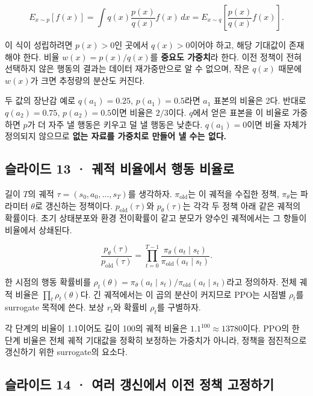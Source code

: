 \documentclass[11pt,a4paper]{article}
\begin{document}
\[
E_{x\sim p}[f(x)]
=\int q(x)\frac{p(x)}{q(x)}f(x)\,dx
=E_{x\sim q}\!\left[\frac{p(x)}{q(x)}f(x)\right].
\]

이 식이 성립하려면 $p(x)>0$인 곳에서 $q(x)>0$이어야 하고, 해당 기대값이 존재해야 한다. 비율 $w(x)=p(x)/q(x)$를 \textbf{중요도 가중치}라 한다. 이전 정책이 전혀 선택하지 않은 행동의 결과는 데이터 재가중만으로 알 수 없으며, 작은 $q(x)$ 때문에 $w(x)$가 크면 추정량의 분산도 커진다.\par

두 값의 장난감 예로 $q(a_1)=0.25$, $p(a_1)=0.5$라면 $a_1$ 표본의 비율은 2다. 반대로 $q(a_2)=0.75$, $p(a_2)=0.5$이면 비율은 $2/3$이다. $q$에서 얻은 표본을 이 비율로 가중하면 $p$가 더 자주 낼 행동은 키우고 덜 낼 행동은 낮춘다. $q(a_1)=0$이면 비율 자체가 정의되지 않으므로 \textbf{없는 자료를 가중치로 만들어 낼 수는 없다.}\par

\subsection{슬라이드 13 · 궤적 비율에서 행동 비율로}

길이 $T$의 궤적 $\tau=(s_0,a_0,\ldots,s_T)$를 생각하자. $\pi_{\mathrm{old}}$는 이 궤적을 수집한 정책, $\pi_\theta$는 파라미터 $\theta$로 갱신하는 정책이다. $p_{\mathrm{old}}(\tau)$와 $p_\theta(\tau)$는 각각 두 정책 아래 같은 궤적의 확률이다. 초기 상태분포와 환경 전이확률이 같고 분모가 양수인 궤적에서는 그 항들이 비율에서 상쇄된다.\par

\[
\frac{p_\theta(\tau)}{p_{\mathrm{old}}(\tau)}
=\prod_{t=0}^{T-1}
\frac{\pi_\theta(a_t\mid s_t)}
{\pi_{\mathrm{old}}(a_t\mid s_t)}.
\]

한 시점의 행동 확률비를 $\rho_t(\theta)=\pi_\theta(a_t\mid s_t)/\pi_{\mathrm{old}}(a_t\mid s_t)$라고 정의하자. 전체 궤적 비율은 $\prod_t\rho_t(\theta)$다. 긴 궤적에서는 이 곱의 분산이 커지므로 PPO는 시점별 $\rho_t$를 surrogate 목적에 쓴다. 보상 $r_t$와 확률비 $\rho_t$를 구별하자.\par

각 단계의 비율이 1.1이어도 길이 100의 궤적 비율은 $1.1^{100}\approx13780$이다. PPO의 한 단계 비율은 전체 궤적 기대값을 정확히 보정하는 가중치가 아니라, 정책을 점진적으로 갱신하기 위한 surrogate의 요소다.\par

\subsection{슬라이드 14 · 여러 갱신에서 이전 정책 고정하기}
\end{document}
